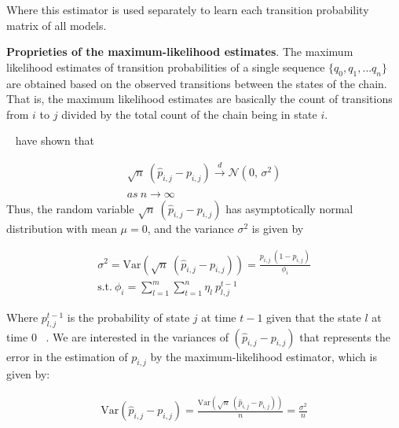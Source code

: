 Where this estimator is used separately to learn each transition probability matrix of all \pmcmr models.   


\textbf{Proprieties of the maximum-likelihood estimates}. 
	The maximum likelihood estimates of transition probabilities of a single sequence $\{q_0, q_1, \ldots q_n\}$  are obtained based on the observed transitions between the states of the chain. That is, the maximum likelihood estimates are basically the count of transitions from $i$ to $j$ divided by the total count of the chain being in state $i$.  
	
	\par ~\citet{anderson1957statistical} have shown that 
	
	

	\begin{equation}
	\begin{aligned}
	\label{eq:lim_dist}
	 \sqrt{n}\ (\hat{p}_{i,j} - {p}_{i,j}) \xrightarrow{d} \mathcal{N}(0,\,\sigma^{2})\\
	 as\ n \xrightarrow{} \infty
	 \end{aligned}
	\end{equation}
Thus, the random variable $\sqrt{n}\ (\hat{p}_{i,j} - {p}_{i,j})$ has asymptotically normal distribution with mean $\mu=0$, and the variance $\sigma^{2}$ is given by   

\begin{equation}
\begin{aligned}
\sigma^{2}=\mathrm{Var}(\sqrt{n}\ (\hat{p}_{i,j} - {p}_{i,j})) = \frac {{p}_{i,j}\ (1- {p}_{i,j})} {\phi_{i}} \\
\text{s.t.}\ \phi_{i} = \sum_{l=1}^{m} \sum_{t=1}^{n} \eta_{l} \ p_{l,j}^{t-1}
\end{aligned}
\end{equation}

Where $p_{l,j}^{t-1}$ is the probability of state $j$ at time $t-1$ given that the state $l$ at time $0$ ~\cite{anderson1957statistical}. We are interested in the variances of $(\hat{p}_{i,j} - {p}_{i,j})$ that represents the error in the estimation of ${p}_{i,j}$ by the maximum-likelihood estimator, which is given by:

	\begin{equation}
\begin{aligned}
\label{eq:var_isol}
	\mathrm{Var} (\hat{p}_{i,j} - {p}_{i,j}) =  \frac {\mathrm{Var}(\sqrt{n}\ (\hat{p}_{i,j} - {p}_{i,j}))}{n} = \frac {\sigma^{2}}{n} 
\end{aligned}
\end{equation}

